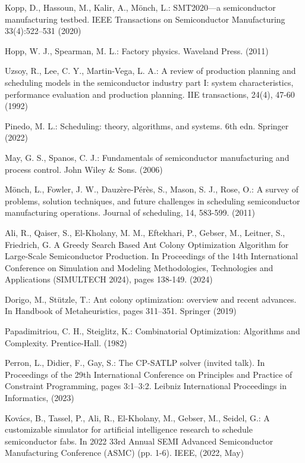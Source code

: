 \begin{thebibliography}{8}
	Kopp, D., Hassoun, M., Kalir, A., Mönch, L.: SMT2020—a semiconductor manufacturing testbed. IEEE Transactions on Semiconductor Manufacturing 33(4):522–531 (2020)
	
	Hopp, W. J., Spearman, M. L.: Factory physics. Waveland Press. (2011)
	
	Uzsoy, R., Lee, C. Y., Martin-Vega, L. A.: A review of production planning and scheduling models in the semiconductor industry part I: system characteristics, performance evaluation and production planning. IIE transactions, 24(4), 47-60 (1992)
	
	Pinedo, M. L.: Scheduling: theory, algorithms, and systems. 6th edn. Springer (2022) 
	
	May, G. S., Spanos, C. J.: Fundamentals of semiconductor manufacturing and process control. John Wiley \& Sons. (2006)
	
	Mönch, L., Fowler, J. W., Dauzère-Pérès, S., Mason, S. J., Rose, O.: A survey of problems, solution techniques, and future challenges in scheduling semiconductor manufacturing operations. Journal of scheduling, 14, 583-599. (2011)
	
	Ali, R., Qaiser, S., El-Kholany, M. M., Eftekhari, P., Gebser, M., Leitner, S., Friedrich, G. A Greedy Search Based Ant Colony Optimization Algorithm for Large-Scale Semiconductor Production. In Proceedings of the 14th International Conference on Simulation and Modeling Methodologies, Technologies and Applications (SIMULTECH 2024), pages 138-149. (2024)
	
	Dorigo, M., Stützle, T.: Ant colony optimization: overview and recent advances. In Handbook of Metaheuristics, pages 311–351. Springer (2019)
	
	Papadimitriou, C. H., Steiglitz, K.: Combinatorial Optimization: Algorithms and Complexity. Prentice-Hall. (1982)
	
	Perron, L., Didier, F., Gay, S.: The CP-SATLP
	solver (invited talk). In Proceedings of the 29th
	International Conference on Principles and Practice
	of Constraint Programming, pages 3:1–3:2. Leibniz
	International Proceedings in Informatics, (2023)
	
	Kovács, B., Tassel, P., Ali, R., El-Kholany, M., Gebser, M., Seidel, G.: A customizable simulator for artificial intelligence research to schedule semiconductor fabs. In 2022 33rd Annual SEMI Advanced Semiconductor Manufacturing Conference (ASMC) (pp. 1-6). IEEE, (2022, May)
	

\end{thebibliography}
